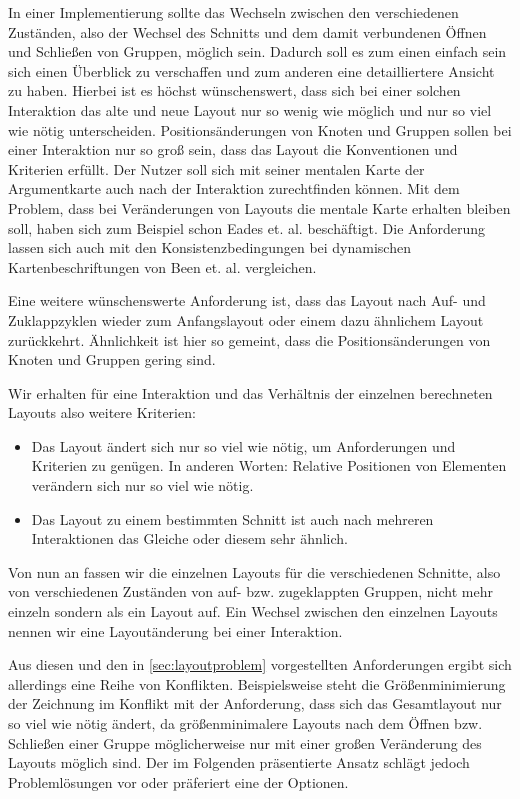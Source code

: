 In einer Implementierung sollte das Wechseln zwischen den verschiedenen Zuständen, also der Wechsel des Schnitts und dem damit verbundenen Öffnen und Schließen von Gruppen, möglich sein. 
Dadurch soll es zum einen einfach sein sich einen Überblick zu verschaffen und zum anderen eine detailliertere Ansicht zu haben.
Hierbei ist es höchst wünschenswert, dass sich bei einer solchen Interaktion das alte und neue Layout nur so wenig wie möglich und nur so viel wie nötig unterscheiden. 
Positionsänderungen von Knoten und Gruppen sollen bei einer Interaktion nur so groß sein, dass das Layout die Konventionen und Kriterien erfüllt.
Der Nutzer soll sich mit seiner mentalen Karte der Argumentkarte auch nach der Interaktion zurechtfinden können. 
Mit dem Problem, dass bei Veränderungen von Layouts die mentale Karte erhalten bleiben soll, haben sich zum Beispiel schon Eades et. al. \cite{eades1991preserving, Misue1995183}
beschäftigt. Die Anforderung lassen sich auch mit den Konsistenzbedingungen bei dynamischen Kartenbeschriftungen von  Been et. al. \cite{Been2010312} vergleichen.

Eine weitere wünschenswerte Anforderung ist, dass das Layout nach  Auf- und Zuklappzyklen 
wieder zum Anfangslayout oder einem dazu ähnlichem Layout zurückkehrt. 
Ähnlichkeit ist hier so gemeint, dass die Positionsänderungen von Knoten und Gruppen gering sind.

Wir erhalten für eine Interaktion und das Verhältnis der einzelnen berechneten Layouts also weitere Kriterien:
\begin{itemize}
\item Das Layout ändert sich nur so viel wie nötig, um Anforderungen und Kriterien zu genügen. In anderen Worten: Relative Positionen von Elementen verändern sich nur so viel wie nötig.
\item Das Layout zu einem bestimmten Schnitt ist auch nach mehreren Interaktionen das Gleiche oder diesem sehr ähnlich.
\end{itemize}

Von nun an fassen wir die einzelnen Layouts für die verschiedenen Schnitte, also von verschiedenen Zuständen von auf- bzw. zugeklappten Gruppen, nicht mehr einzeln
sondern als ein Layout auf. Ein Wechsel zwischen den einzelnen Layouts nennen wir eine Layoutänderung bei einer Interaktion.

Aus diesen und den in \autoref{sec:layoutproblem} vorgestellten Anforderungen ergibt sich allerdings eine Reihe von Konflikten.
Beispielsweise steht die Größenminimierung der Zeichnung im Konflikt mit der Anforderung, dass sich das Gesamtlayout nur so viel wie nötig ändert, 
da größenminimalere Layouts nach dem Öffnen bzw. Schließen einer Gruppe möglicherweise nur mit einer großen Veränderung des Layouts möglich sind.
Der im Folgenden präsentierte Ansatz schlägt jedoch Problemlösungen vor oder präferiert eine der Optionen.

